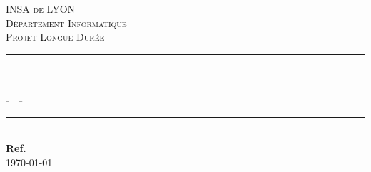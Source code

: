 \begin{titlepage}

\newcommand{\HRule}{\rule{\linewidth}{0.5mm}} %

\center %
 

\vspace*{1cm}

\textsc{\LARGE INSA de LYON}\\[1.5cm] 
\textsc{\Large D\'epartement Informatique}\\[0.5cm] 
\textsc{\large Projet Longue Durée}\\[0.5cm] %


\HRule \\[0.4cm]
{ \huge \bfseries \mainTitle}\\[0.1cm]
{\large \bfseries - \secondTitle~-} 
\HRule \\[1.5cm]


{\bf{Ref. \documentRef}}\\[0.5cm] %


{\large \today}\\[2cm] %
 


\end{titlepage}
